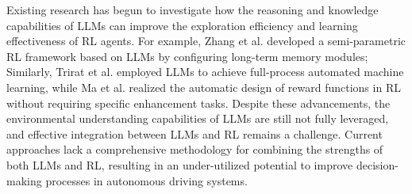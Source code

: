 Existing research has begun to investigate how the reasoning and knowledge capabilities of LLMs can improve the exploration efficiency and learning effectiveness of RL agents\cite{liu2024language}. For example, Zhang et al.\cite{zhang2024large} developed a semi-parametric RL framework based on LLMs by configuring long-term memory modules; Similarly, Trirat et al.\cite{trirat2024automl} employed LLMs to achieve full-process automated machine learning, while Ma et al.\cite{ma2023eureka} realized the automatic design of reward functions in RL without requiring specific enhancement tasks. Despite these advancements, the environmental understanding capabilities of LLMs are still not fully leveraged, and effective integration between LLMs and RL remains a challenge. Current approaches lack a comprehensive methodology for combining the strengths of both LLMs and RL, resulting in an under-utilized potential to improve decision-making processes in autonomous driving systems.